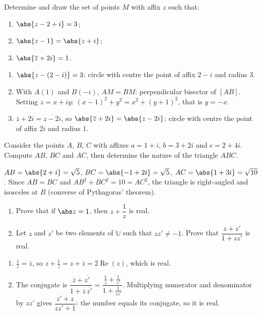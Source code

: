 \begin{exercise}
Determine and draw the set of points $M$ with affix $z$ such that:
\begin{enumerate}
\item $\abs{z-2+i}=3$;
\item $\abs{z-1}=\abs{z+i}$;
\item $\abs{\overline z+2i}=1$.
\end{enumerate}
\end{exercise}
\begin{solution}
\begin{enumerate}
\item $\abs{z-(2-i)}=3$: circle with centre the point of affix $2-i$ and radius $3$.
\item With $A(1)$ and $B(-i)$, $AM=BM$: perpendicular bisector of $[AB]$. Setting $z=x+iy$: $(x-1)^2+y^2=x^2+(y+1)^2$, that is $y=-x$.
\item $\overline z+2i=\overline{z-2i}$, so $\abs{\overline z+2i}=\abs{z-2i}$: circle with centre the point of affix $2i$ and radius $1$.
\end{enumerate}
\end{solution}

\begin{exercise}
Consider the points $A$, $B$, $C$ with affixes $a=1+i$, $b=3+2i$ and $c=2+4i$. Compute $AB$, $BC$ and $AC$, then determine the nature of the triangle $ABC$.
\end{exercise}
\begin{solution}
$AB=\abs{2+i}=\sqrt5$, $BC=\abs{-1+2i}=\sqrt5$, $AC=\abs{1+3i}=\sqrt{10}$. Since $AB=BC$ and $AB^2+BC^2=10=AC^2$, the triangle is right-angled and isosceles at $B$ (converse of Pythagoras' theorem).
\end{solution}

\begin{exercise}
\begin{enumerate}
\item Prove that if $\abs z=1$, then $z+\dfrac1z$ is real.
\item Let $z$ and $z'$ be two elements of $\mathbb U$ such that $zz'\neq-1$. Prove that $\dfrac{z+z'}{1+zz'}$ is real.
\end{enumerate}
\end{exercise}
\begin{solution}
\begin{enumerate}
\item $\frac1z=\overline z$, so $z+\frac1z=z+\overline z=2\operatorname{Re}(z)$, which is real.
\item The conjugate is $\dfrac{\overline z+\overline{z'}}{1+\overline z\,\overline{z'}}=\dfrac{\frac1z+\frac1{z'}}{1+\frac1{zz'}}$. Multiplying numerator and denominator by $zz'$ gives $\dfrac{z'+z}{zz'+1}$: the number equals its conjugate, so it is real.
\end{enumerate}
\end{solution}

